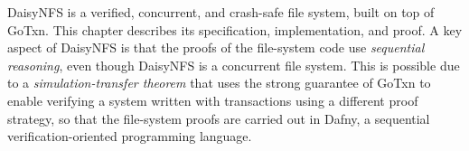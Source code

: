 DaisyNFS is a verified, concurrent, and crash-safe file system, built on top of
GoTxn. This chapter describes its specification, implementation, and proof. A
key aspect of DaisyNFS is that the proofs of the file-system code use \emph{sequential
reasoning}, even though DaisyNFS is a concurrent file system. This is possible
due to a \emph{simulation-transfer theorem} that uses the strong
guarantee of GoTxn to enable verifying a system written with transactions using
a different proof strategy, so that the file-system proofs are carried out in
Dafny, a sequential verification-oriented programming language.






